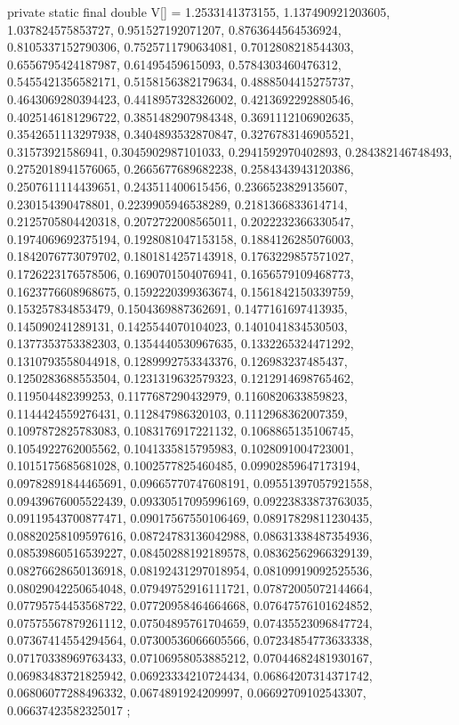 \begin{code}
\begin{hide}
   private static final double V[] = {
        1.2533141373155,      1.137490921203605,      1.037824575853727,
      0.951527192071207,     0.8763644564536924,     0.8105337152790306,
     0.7525711790634081,     0.7012808218544303,     0.6556795424187987,
       0.61495459615093,     0.5784303460476312,     0.5455421356582171,
     0.5158156382179634,     0.4888504415275737,     0.4643069280394423,
     0.4418957328326002,     0.4213692292880546,     0.4025146181296722,
     0.3851482907984348,     0.3691112106902635,     0.3542651113297938,
     0.3404893532870847,     0.3276783146905521,       0.31573921586941,
     0.3045902987101033,     0.2941592970402893,      0.284382146748493,
     0.2752018941576065,     0.2665677689682238,     0.2584343943120386,
     0.2507611114439651,      0.243511400615456,     0.2366523829135607,
      0.230154390478801,     0.2239905946538289,     0.2181366833614714,
     0.2125705804420318,     0.2072722008565011,     0.2022232366330547,
     0.1974069692375194,     0.1928081047153158,     0.1884126285076003,
     0.1842076773079702,     0.1801814257143918,     0.1763229857571027,
     0.1726223176578506,     0.1690701504076941,     0.1656579109468773,
     0.1623776608968675,     0.1592220399363674,     0.1561842150339759,
      0.153257834853479,     0.1504369887362691,     0.1477161697413935,
      0.145090241289131,     0.1425544070104023,     0.1401041834530503,
     0.1377353753382303,     0.1354440530967635,     0.1332265324471292,
     0.1310793558044918,     0.1289992753343376,      0.126983237485437,
     0.1250283688553504,     0.1231319632579323,     0.1212914698765462,
      0.119504482399253,     0.1177687290432979,     0.1160820633859823,
     0.1144424559276431,      0.112847986320103,     0.1112968362007359,
     0.1097872825783083,     0.1083176917221132,     0.1068865135106745,
     0.1054922762005562,     0.1041335815795983,     0.1028091004723001,
     0.1015175685681028,     0.1002577825460485,    0.09902859647173194,
    0.09782891844465691,    0.09665770747608191,    0.09551397057921558,
    0.09439676005522439,    0.09330517095996169,    0.09223833873763035,
    0.09119543700877471,    0.09017567550106469,    0.08917829811230435,
    0.08820258109597616,    0.08724783136042988,    0.08631338487354936,
    0.08539860516539227,    0.08450288192189578,    0.08362562966329139,
    0.08276628650136918,    0.08192431297018954,    0.08109919092525536,
    0.08029042250654048,    0.07949752916111721,    0.07872005072144664,
    0.07795754453568722,    0.07720958464664668,    0.07647576101624852,
    0.07575567879261112,    0.07504895761704659,    0.07435523096847724,
    0.07367414554294564,    0.07300536066605566,    0.07234854773633338,
    0.07170338969763433,    0.07106958053885212,    0.07044682481930167,
    0.06983483721825942,    0.06923334210724434,    0.06864207314371742,
    0.06806077288496332,     0.0674891924209997,    0.06692709102543307,
    0.06637423582325017
};
\end{hide}


\end{code}
